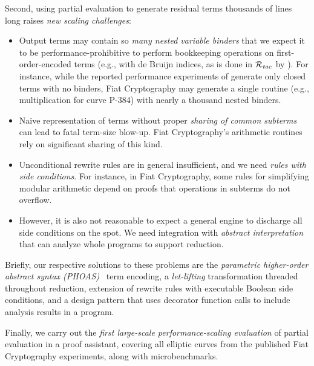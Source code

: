 \documentclass[sigplan,10pt,review,anonymous]{acmart}\settopmatter{printfolios=true,printccs=false,printacmref=false}
\newcommand{\todo}[1]{\textbf{TODO: #1}}
\newcommand{\Rtac}{\ensuremath{\mathcal{R}_\text{\emph{tac}}}}
\begin{document}
Second, using partial evaluation to generate residual terms thousands of lines long raises \emph{new scaling challenges}:
\begin{itemize}
\item Output terms may contain so \emph{many nested variable binders} that we expect it to be performance-prohibitive to perform bookkeeping operations on first-order-encoded terms (e.g., with de Bruijn indices, as is done in \Rtac{} by \citet{rtac}).  For instance, while the reported performance experiments of \citet{Aehlig} generate only closed terms with no binders, Fiat Cryptography may generate a single routine (e.g., multiplication for curve P-384) with nearly a thousand nested binders.
\item Naive representation of terms without proper \emph{sharing of common subterms} can lead to fatal term-size blow-up.  Fiat Cryptography's arithmetic routines rely on significant sharing of this kind.
\item Unconditional rewrite rules are in general insufficient, and we need \emph{rules with side conditions}.  For instance, in Fiat Cryptography, some rules for simplifying modular arithmetic depend on proofs that operations in subterms do not overflow.
\item However, it is also not reasonable to expect a general engine to discharge all side conditions on the spot.  We need integration with \emph{abstract interpretation} that can analyze whole programs to support reduction.
\end{itemize}

Briefly, our respective solutions to these problems are the \emph{parametric higher-order abstract syntax (PHOAS)}~\cite{PhoasICFP08} term encoding, a \emph{let-lifting} transformation threaded throughout reduction, extension of rewrite rules with executable Boolean side conditions, and a design pattern that uses decorator function calls to include analysis results in a program.

Finally, we carry out the \emph{first large-scale performance-scaling evaluation} of partial evaluation in a proof assistant, covering all elliptic curves from the published Fiat Cryptography experiments, along with microbenchmarks.
\end{document}
